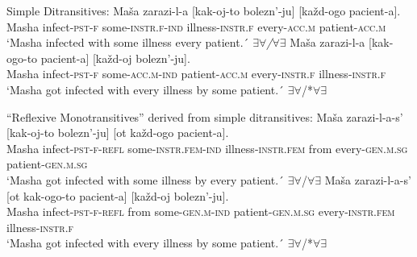 \documentclass[output=paper,colorlinks,citecolor=brown,modfonts,nonflat]{langsci/langscibook}
\begin{document}
\ea%
    \label{ex:antonyuk:6}
    Simple Ditransitives:
    \ea \label{ex:antonyuk:6a}
    \gll    Maša zarazi-l-a	[kak-oj-to bolezn’-ju] [každ-ogo pacient-a].\\
            Masha infect\textsc{-pst-f} \hspaceThis{[}some\textsc{-instr.f-ind} illness\textsc{-instr.f} \hspaceThis{[}every\textsc{-acc.m} patient\textsc{-acc.m}\\
    \glt    `Masha infected with some illness every patient.´ 
            \hfill \textit{${\exists}{\forall}$/${\forall}{\exists}$}
    \ex \label{ex:antonyuk:6b}
    \gll    Maša zarazi-l-a	[kak-ogo-to	pacient-a] [každ-oj	bolezn’-ju].\\
            Masha infect\textsc{-pst-f} \hspaceThis{[}some\textsc{-acc.m-ind} patient\textsc{-acc.m} \hspaceThis{[}every\textsc{-instr.f} illness\textsc{-instr.f}\\
    \glt    `Masha got infected with every illness by some patient.´ 
            \hfill ${\exists}{\forall}$/*${\forall}{\exists}$
    \z
\z

\ea%
    \label{ex:antonyuk:7}
    “Reflexive Monotransitives” derived from simple ditransitives:
    \ea \label{ex:antonyuk:7a}
    \gll    Maša zarazi-l-a-s’ [kak-oj-to bolezn’-ju] [ot každ-ogo pacient-a].\\
            Masha infect\textsc{-pst-f-refl} \hspaceThis{[}some\textsc{-instr.fem-ind} illness\textsc{-instr.fem} \hspaceThis{[}from every\textsc{-gen.m.sg} patient\textsc{-gen.m.sg}\\
    \glt    `Masha got infected with some illness by every patient.´ 
            \hfill ${\exists}{\forall}$/${\forall}{\exists}$
    \ex \label{ex:antonyuk:7b}
    \gll    Maša zarazi-l-a-s’ [ot kak-ogo-to pacient-a] [každ-oj bolezn’-ju].\\
            Masha infect\textsc{-pst-f-refl} \hspaceThis{[}from some\textsc{-gen.m-ind} patient\textsc{-gen.m.sg} \hspaceThis{[}every\textsc{-instr.fem} illness\textsc{-instr.f}\\
    \glt    `Masha got infected with every illness by some patient.´ 
            \hfill ${\exists}{\forall}$/*${\forall}{\exists}$
    \z
\z
\end{document}
